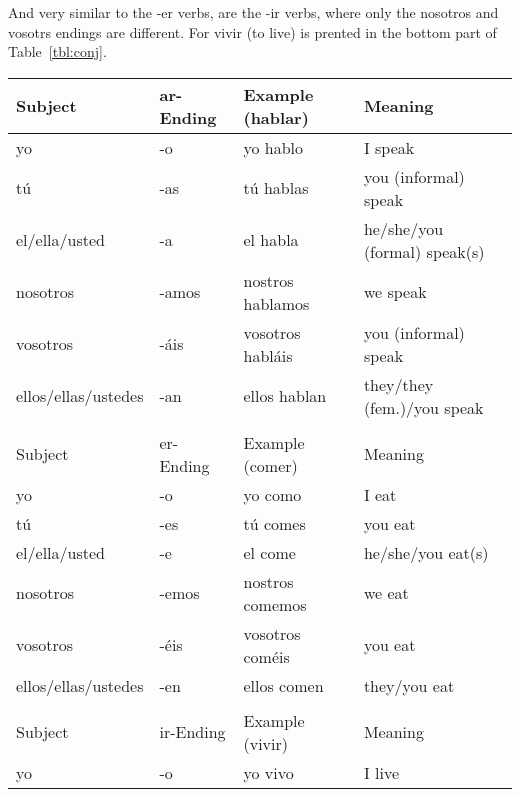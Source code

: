 \documentclass[a4paper,12pt]{article}
\begin{document}
And very similar to the -er verbs, are the -ir verbs, where only the nosotros and vosotrs endings
are different. For \textsf{vivir} (to live) is prented in the bottom part of Table~\ref{tbl:conj}.


\begin{table}[t!]
\centering
\begin{tabular}{llll}
  Subject             & ar-Ending & Example (hablar) & Meaning                      \\
  \toprule
  yo                  & -o        & yo hablo         & I speak                      \\
  tú                  & -as       & tú hablas        & you (informal) speak         \\
  el/ella/usted       & -a        & el habla         & he/she/you (formal) speak(s) \\
  nosotros            & -amos     & nostros hablamos & we speak                     \\
  vosotros            & -áis      & vosotros habláis & you (informal) speak         \\
  ellos/ellas/ustedes & -an       & ellos hablan     & they/they (fem.)/you speak   \\
  \midrule
                      &           &                  &                              \\
  Subject             & er-Ending & Example (comer)  & Meaning                      \\
  \toprule
  yo                  & -o        & yo como          & I eat                        \\
  tú                  & -es       & tú comes         & you eat                      \\
  el/ella/usted       & -e        & el come          & he/she/you eat(s)            \\
  nosotros            & -emos     & nostros comemos  & we eat                       \\
  vosotros            & -éis      & vosotros coméis  & you eat                      \\
  ellos/ellas/ustedes & -en       & ellos comen      & they/you eat                 \\
  \midrule
                      &           &                  &                              \\
  Subject             & ir-Ending & Example (vivir)  & Meaning                      \\
  \toprule
  yo                  & -o        & yo vivo          & I live                       \\

\end{tabular}
\end{table}
\end{document}
